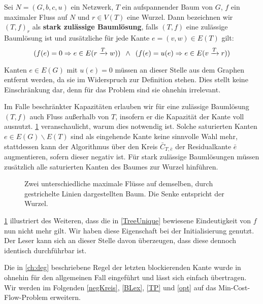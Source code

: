 \begin{defn}Sei $N=(G,b,c,u)$ ein Netzwerk, $T$ ein aufspannender Baum von $G$, $f$ ein maximaler Fluss auf $N$ und $r\in V(T)$ eine Wurzel. Dann bezeichnen wir $(T,f)_r$ als \textbf{stark zulässige Baumlösung}, falls $(T,f)$ eine zulässige Baumlösung ist und zusätzliche für jede Kante $e=(v,w)\in E(T)$ gilt:
\begin{equation*} (f(e)=0 \Rightarrow e\in E(r\xrightarrow{T}w))\enskip\land\enskip(f(e)=u(e) \Rightarrow e\in E(v\xrightarrow{T}r))
\end{equation*}\end{defn}
\begin{anm}Kanten $e\in E(G)$ mit $u(e)=0$ müssen an dieser Stelle aus dem Graphen entfernt werden, da sie im Widerspruch zur Definition stehen. Dies stellt keine Einschränkung dar, denn für das Problem sind sie ohnehin irrelevant.\end{anm}

Im Falle beschränkter Kapazitäten erlauben wir für eine zulässige Baumlösung $(T,f)$ auch Fluss außerhalb von $T$, insofern er die Kapazität der Kante voll ausnutzt. \cref{fig:NSA} veranschaulicht, warum dies notwendig ist. Solche saturierten Kanten $e\in E(G)\backslash E(T)$ sind als eingehende Kante keine sinnvolle Wahl mehr, stattdessen kann der Algorithmus über den Kreis $\bar{C}_{T,\bar{e}}$ der Residualkante $\bar{e}$ augmentieren, sofern dieser negativ ist. Für stark zulässige Baumlösungen müssen zusätzlich alle saturierten Kanten des Baumes zur Wurzel hinführen.

\begin{figure}[!ht]\centering
		
	\caption{Zwei unterschiedliche maximale Flüsse auf demselben, durch gestrichelte Linien dargestellten Baum. Die Senke entspricht der Wurzel.}
	\label{fig:NSA}
\end{figure}

\cref{fig:NSA} illustriert des Weiteren, dass die in \cref{TreeUnique} bewiesene Eindeutigkeit von $f$ nun nicht mehr gilt. Wir haben diese Eigenschaft bei der Initialisierung genutzt. Der Leser kann sich an dieser Stelle davon überzeugen, dass diese dennoch identisch durchführbar ist.

Die in \cref{ch:deg} beschriebene Regel der letzten blockierenden Kante wurde in \cite{cycling} ohnehin für den allgemeinen Fall eingeführt und lässt sich einfach übertragen. Wir werden im Folgenden \cref{negKreis}, \cref{BLex}, \cref{TP} und \cref{opt} auf das Min-Cost-Flow-Problem erweitern.

